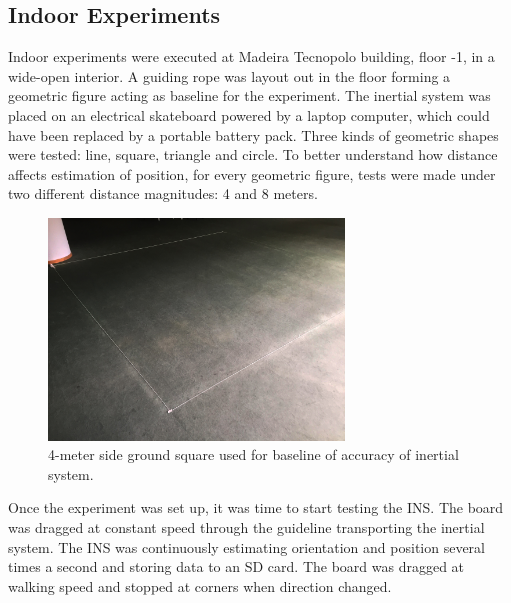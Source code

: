 \subsection{Indoor Experiments}

Indoor experiments were executed at Madeira Tecnopolo building, floor -1, in a wide-open interior. A guiding rope was layout out in the floor forming a geometric figure acting as baseline for the experiment. The inertial system was placed on an electrical skateboard powered by a laptop computer, which could have been replaced by a portable battery pack. Three kinds of geometric shapes were tested: line, square, triangle and circle. To better understand how distance affects estimation of position, for every geometric figure, tests were made under two different distance magnitudes: 4 and 8 meters.

\begin{figure}[!h]
  \centering
  \includegraphics[width=0.7\textwidth]{figures/indoor.jpg}
  \caption{4-meter side ground square used for baseline of accuracy of inertial system.}
  \label{fig:indoor_square}
\end{figure}

Once the experiment was set up, it was time to start testing the INS. The board was dragged at constant speed through the guideline transporting the inertial system. The INS was continuously estimating orientation and position several times a second and storing data to an SD card. The board was dragged at walking speed and stopped at corners when direction changed.

